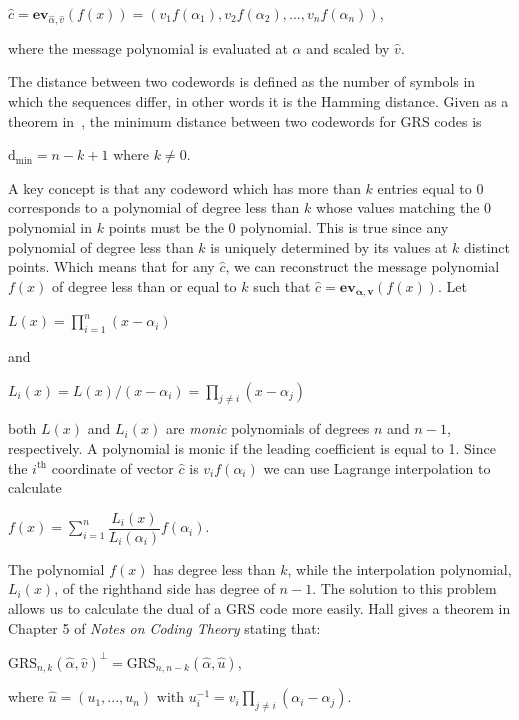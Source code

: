 \documentclass{article}
\begin{document}
\begin{center}
$\hat{c} = \textbf{ev}_{\hat{\alpha},\hat{v}}(f(x)) = (v_{1}f(\alpha_{1}),v_{2}f(\alpha_{2}),...,v_{n}f(\alpha_{n}))$,
\end{center}
where the message polynomial is evaluated at $\hat{\alpha}$ and scaled by $\hat{v}$.

The distance between two codewords is defined as the number of symbols in which the sequences differ, in other words it is the Hamming distance. Given as a theorem in~\cite{Hall:2012}, the minimum distance between two codewords for GRS codes is

\begin{center}
$\text{d}_{\text{min}} = n - k + 1$ where $k \neq 0$.
\end{center}

A key concept is that any codeword which has more than $k$ entries equal to 0 corresponds to a polynomial of degree less than $k$ whose values matching the 0 polynomial in $k$ points must be the 0 polynomial. This is true since any polynomial of degree less than $k$ is uniquely determined by its values at $k$ distinct points. Which means that for any $\hat{c}$, we can reconstruct the message polynomial $f(x)$ of degree less than or equal to $k$ such that $\hat{c} = \textbf{ev}_{\boldsymbol\alpha,\textbf{v}}(f(x))$. Let

\begin{center}
$L(x) = \prod\limits_{i=1}^{n} (x - \alpha_{i})$
\end{center}
and
\begin{center}
$L_{i}(x) = L(x)/(x - \alpha_{i}) = \prod\limits_{j \neq i} (x - \alpha_{j})$
\end{center}
both $L(x)$ and $L_{i}(x)$ are \textit{monic} polynomials of degrees $n$ and $n - 1$, respectively. A polynomial is monic if the leading coefficient is equal to 1. Since the $i^{\text{th}}$ coordinate of vector $\hat{c}$ is $v_{i}f(\alpha_{i})$ we can use Lagrange interpolation to calculate
\begin{center}
$f(x) = \sum\limits_{i=1}^{n} \dfrac{L_{i}(x)}{L_{i}(\alpha_{i})}f(\alpha_{i})$.
\end{center}

The polynomial $f(x)$ has degree less than $k$, while the interpolation polynomial, $L_{i}(x)$, of the righthand side has degree of $n - 1$. The solution to this problem allows us to calculate the dual of a GRS code more easily. Hall gives a theorem in Chapter 5 of \textit{Notes on Coding Theory} stating that:
\begin{center}
$\text{GRS}_{n,k}(\hat{\alpha}, \hat{v})^{\perp} = \text{GRS}_{n,n - k}(\hat{\alpha}, \hat{u})$,
\end{center}
where $\hat{u} = (u_{1},...,u_{n}) \text{ with } u_{i}^{-1} = v_{i}\prod\limits_{j \neq i} (\alpha_{i} - \alpha_{j})$.
\end{document}
